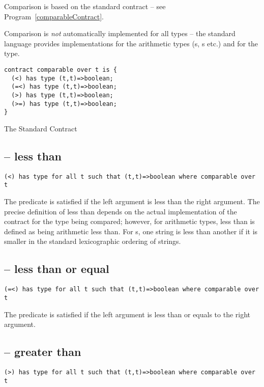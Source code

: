 Comparison is based on the standard  contract -- see Program~\vref{comparableContract}.

Comparison is \emph{not} automatically implemented for all types -- the standard language provides implementations for the arithmetic types (s, s etc.) and for the  type.


\begin{program}
\begin{lstlisting}
contract comparable over t is {
  (<) has type (t,t)=>boolean;
  (=<) has type (t,t)=>boolean;
  (>) has type (t,t)=>boolean;
  (>=) has type (t,t)=>boolean;
}
\end{lstlisting}
\caption{The Standard  Contract\label{comparableContract}}
\end{program}

\subsection{\q{<} -- less than}
\begin{lstlisting}
(<) has type for all t such that (t,t)=>boolean where comparable over t
\end{lstlisting}

The \q{<} predicate is satisfied if the left argument is less than the right argument. The precise definition of less than depends on the actual implementation of the  contract for the type being compared; however, for arithmetic types, less than is defined as being arithmetic less than. For s, one string is less than another if it is smaller in the standard lexicographic ordering of strings.

\subsection{\q{=<} -- less than or equal}
\begin{lstlisting}
(=<) has type for all t such that (t,t)=>boolean where comparable over t
\end{lstlisting}

The \q{=<} predicate is satisfied if the left argument is less than or equals to the right argument.

\subsection{\q{>} -- greater than}
\begin{lstlisting}
(>) has type for all t such that (t,t)=>boolean where comparable over t
\end{lstlisting}

